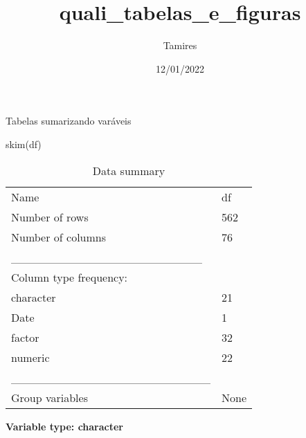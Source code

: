 \documentclass[
]{article}
\title{quali\_tabelas\_e\_figuras}
\author{Tamires}
\date{12/01/2022}
\newenvironment{Shaded}{\begin{snugshade}}{\end{snugshade}}
\newcommand{\FunctionTok}[1]{\textcolor[rgb]{0.00,0.00,0.00}{#1}}
\newcommand{\NormalTok}[1]{#1}
\begin{document}
\maketitle

Tabelas sumarizando varáveis

\begin{Shaded}
\begin{Highlighting}[]
\FunctionTok{skim}\NormalTok{(df)}
\end{Highlighting}
\end{Shaded}

\begin{longtable}[]{@{}ll@{}}
\caption{Data summary}\tabularnewline
\toprule
\endhead
Name & df \\
Number of rows & 562 \\
Number of columns & 76 \\
\_\_\_\_\_\_\_\_\_\_\_\_\_\_\_\_\_\_\_\_\_\_\_ & \\
Column type frequency: & \\
character & 21 \\
Date & 1 \\
factor & 32 \\
numeric & 22 \\
\_\_\_\_\_\_\_\_\_\_\_\_\_\_\_\_\_\_\_\_\_\_\_\_ & \\
Group variables & None \\
\bottomrule
\end{longtable}

\textbf{Variable type: character}
\end{document}

